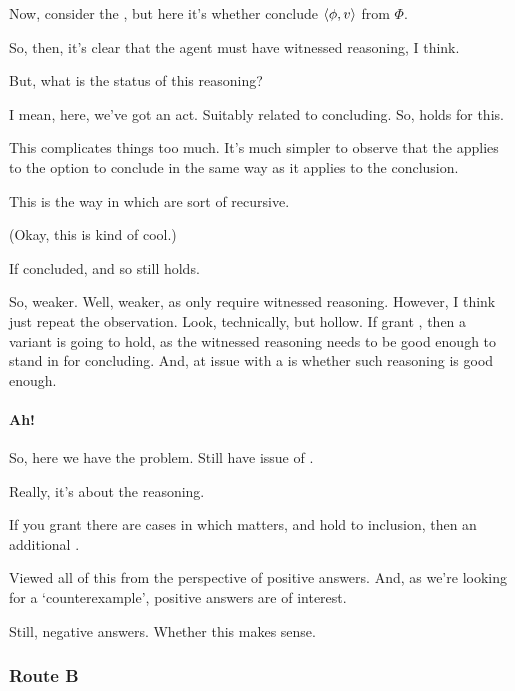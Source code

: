 \begin{note}
  Now, consider the \requ{}, but here it's whether conclude \(\langle \phi, v \rangle\) from \(\Phi\).

  So, then, it's clear that the agent must have witnessed reasoning, I think.

  But, what is the status of this reasoning?

  I mean, here, we've got an act.
  Suitably related to concluding.
  So, \requ{} holds for this.

  {
    \color{red}
    This complicates things too much.
    It's much simpler to observe that the \requ{} applies to the option to conclude in the same way as it applies to the conclusion.

    This is the way in which  are sort of recursive.
  }

  (Okay, this is kind of cool.)

  If concluded, and so \requ{} still holds.

  So, weaker.
  Well, weaker, as only require witnessed reasoning.
  However, I think just repeat the observation.
  Look, technically, but hollow.
  If grant \requ{}, then a variant is going to hold, as the witnessed reasoning needs to be good enough to stand in for concluding.
  And, at issue with a \requ{} is whether such reasoning is good enough.
\end{note}

\paragraph{Ah!}

\begin{note}
  So, here we have the problem.
  Still have issue of \requ{}.

  Really, it's about the reasoning.

  If you grant there are cases in which \qzS{} matters, and hold to inclusion, then an additional \requ{}.
\end{note}

\begin{note}
  Viewed all of this from the perspective of positive answers.
  And, as we're looking for a `counterexample', positive answers are of interest.

  Still, negative answers.
  Whether this makes sense.
\end{note}

\subsubsection{Route B}
\label{sec:route-B}

